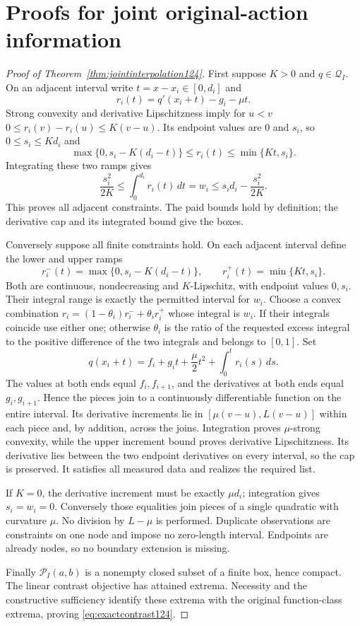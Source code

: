 \section{Proofs for joint original-action information}
\label{supp:jointinformation124}

\begin{proof}[Proof of Theorem~\ref{thm:jointinterpolation124}]
First suppose $K>0$ and $q\in\mathcal Q_I$. On an adjacent interval
write $t=x-x_i\in[0,d_i]$ and
\[
 r_i(t)=q'(x_i+t)-g_i-\mu t.
\]
Strong convexity and derivative Lipschitzness imply for $u<v$
$0\le r_i(v)-r_i(u)\le K(v-u)$. Its endpoint values are
$0$ and $s_i$, so $0\le s_i\le Kd_i$ and
\[
 \max\{0,s_i-K(d_i-t)\}\le r_i(t)\le\min\{Kt,s_i\}.
\]
Integrating these two ramps gives
\[
 \frac{s_i^2}{2K}\le \int_0^{d_i}r_i(t)\,dt
        =w_i\le s_i d_i-\frac{s_i^2}{2K}.
\]
This proves all adjacent constraints. The paid bounds hold by
definition; the derivative cap and its integrated bound give the boxes.

Conversely suppose all finite constraints hold. On each adjacent
interval define the lower and upper ramps
\[
 r_i^-(t)=\max\{0,s_i-K(d_i-t)\},\qquad
 r_i^+(t)=\min\{Kt,s_i\}.
\]
Both are continuous, nondecreasing and $K$-Lipschitz, with endpoint
values $0,s_i$. Their integral range is exactly the permitted interval
for $w_i$. Choose a convex combination
$r_i=(1-\theta_i)r_i^-+\theta_i r_i^+$ whose integral is $w_i$.
If their integrals coincide use either one; otherwise
$\theta_i$ is the ratio of the requested excess integral to the
positive difference of the two integrals and belongs to $[0,1]$.
Set
\[
 q(x_i+t)=f_i+g_i t+\frac\mu2t^2+\int_0^t r_i(s)\,ds.
\]
The values at both ends equal $f_i,f_{i+1}$, and the derivatives
at both ends equal $g_i,g_{i+1}$. Hence the pieces join to a
continuously differentiable function on the entire interval. Its
derivative increments lie in $[\mu(v-u),L(v-u)]$ within each
piece and, by addition, across the joins. Integration proves
$\mu$-strong convexity, while the upper increment bound proves
derivative Lipschitzness. Its derivative lies between the two endpoint
derivatives on every interval, so the cap is preserved. It satisfies
all measured data and realizes the required list.

If $K=0$, the derivative increment must be exactly $\mu d_i$;
integration gives $s_i=w_i=0$. Conversely those equalities join
pieces of a single quadratic with curvature $\mu$. No division by
$L-\mu$ is performed. Duplicate observations are constraints on one
node and impose no zero-length interval. Endpoints are already nodes,
so no boundary extension is missing.

Finally $\mathcal P_I(a,b)$ is a nonempty closed subset of a finite
box, hence compact. The linear contrast objective has attained extrema.
Necessity and the constructive sufficiency identify these extrema with
the original function-class extrema, proving
\eqref{eq:exactcontrast124}.
\end{proof}

